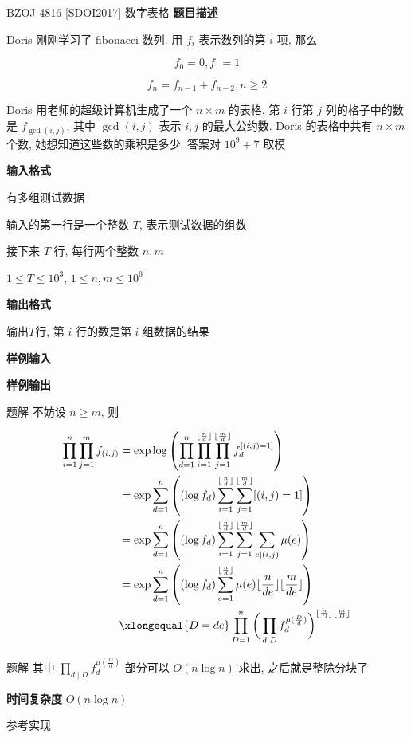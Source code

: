\begin{frame}{BZOJ 4816 {[}SDOI2017{]} 数字表格}
	\label{incexc:example:bzoj4816}
	\textbf{题目描述}

	Doris 刚刚学习了 fibonacci 数列. 用 \(f_i\) 表示数列的第 \(i\) 项, 那么

	\[
		f_0=0,f_1=1
	\]

	\[
		f_n=f_{n-1}+f_{n-2},n\geq 2
	\]

	Doris 用老师的超级计算机生成了一个 \(n\times m\) 的表格, 第 \(i\) 行第 \(j\) 列的格子中的数是 \(f_{\gcd(i,j)}\), 其中 \(\gcd(i,j)\) 表示 \(i,j\) 的最大公约数. Doris 的表格中共有 \(n\times m\) 个数, 她想知道这些数的乘积是多少. 答案对 \(10^9+7\) 取模

	\textbf{输入格式}

	有多组测试数据

	输入的第一行是一个整数 \(T\), 表示测试数据的组数

	接下来 \(T\) 行, 每行两个整数 \(n, m\)

	\(1 \leq T\leq 10^3\), \(1\leq n,m\leq 10^6\)

	\textbf{输出格式}

	输出\(T\)行, 第 \(i\) 行的数是第 \(i\) 组数据的结果

	\textbf{样例输入}


	\textbf{样例输出}

\end{frame}


\begin{frame}{题解}
	不妨设 \(n\geqslant m\), 则

	\pause
	\[
		\begin{aligned}
			\prod_{i=1}^n\prod_{j=1}^mf_{(i,j)} & =\exp\log\left(\prod_{d=1}^n\prod_{i=1}^{\lfloor\frac{n}{d}\rfloor}\prod_{j=1}^{\lfloor\frac{m}{d}\rfloor}f_d^{[(i,j)=1]}\right)             \\
			                                    & =\exp\sum_{d=1}^n\left((\log f_d)\sum_{i=1}^{\lfloor\frac{n}{d}\rfloor}\sum_{j=1}^{\lfloor\frac{m}{d}\rfloor}[(i,j)=1]\right)                \\
			                                    & =\exp\sum_{d=1}^n\left((\log f_d)\sum_{i=1}^{\lfloor\frac{n}{d}\rfloor}\sum_{j=1}^{\lfloor\frac{m}{d}\rfloor}\sum_{e\mid (i,j)}\mu(e)\right) \\
			                                    & =\exp\sum_{d=1}^n\left((\log f_d)\sum_{e=1}^{\lfloor\frac{n}{d}\rfloor}\mu(e)\lfloor\frac{n}{de}\rfloor\lfloor\frac{m}{de}\rfloor\right)     \\
			                                    & \xlongequal{D=de}\prod_{D=1}^n\bigg(\prod_{d\mid D}f_d^{\mu(\frac{D}{d})}\bigg)^{\lfloor\frac{n}{D}\rfloor\lfloor\frac{m}{D}\rfloor}
		\end{aligned}
	\]
\end{frame}


\begin{frame}{题解}
	其中 \(\prod_{d\mid D}f_d^{\mu(\frac{D}{d})}\) 部分可以 \(O(n\log n)\) 求出, 之后就是整除分块了

	\pause
	\textbf{时间复杂度} \(O(n\log n)\)
\end{frame}


\begin{frame}{参考实现}
\end{frame}
